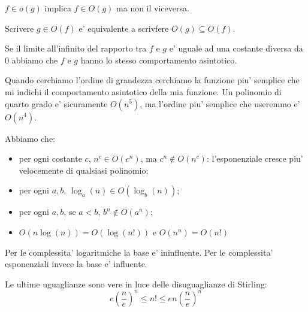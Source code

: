 $f \in o(g)$ implica $f \in O(g)$ ma non il viceversa.

Scrivere $g \in O(f)$ e' equivalente a scrivfere $O(g) \subseteq O(f)$.

Se il limite all'infinito del rapporto tra $f$ e $g$ e' uguale ad una costante diversa da 0 abbiamo che
$f$ e $g$ hanno lo stesso comportamento asintotico.

Quando cerchiamo l'ordine di grandezza cerchiamo la funzione piu' semplice che mi indichi il
comportamento asintotico della mia funzione. Un polinomio di quarto grado e' sicuramente $O(n^{5})$,
ma l'ordine piu' semplice che useremmo e' $O(n^{4})$.

Abbiamo che:
\begin{itemize}
    \item per ogni costante $c$, $n^{c} \in O(c^{n})$, ma $c^{n} \notin O(n^{c})$: l'esponenziale
    cresce piu' velocemente di qualsiasi polinomio;
    \item per ogni $a,b$, $\log_{a}(n) \in O(\log_{b}(n))$;
    \item per ogni $a,b$, se $a < b$, $b^{n} \notin O(a^{n})$;
    \item $O(n \log(n)) = O(\log(n!))$ e $O(n^{n}) = O(n!)$ 
\end{itemize}

Per le complessita' logaritmiche la base e' ininfluente. Per le complessita' esponenziali invece la
base e' influente.

Le ultime uguaglianze sono vere in luce delle disuguaglianze di Stirling:
\begin{equation*}
    e\left(\frac{n}{e}\right)^{n} \leq n! \leq e n \left(\frac{n}{e}\right)^{n}
\end{equation*}

